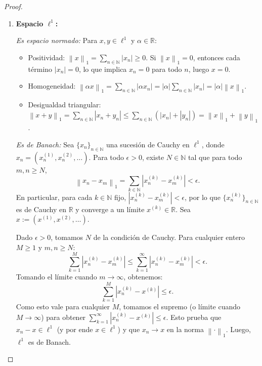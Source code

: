 \documentclass{article}
\theoremstyle{definition}
\newcommand{\R}{\mathbb{R}}
\newcommand{\N}{\mathbb{N}}
\newcommand{\norm}[1]{\left\lVert #1 \right\rVert}       %
\begin{document}
\begin{proof}
    \begin{enumerate}
        \item \textbf{Espacio \( \ell^1 \):}

              \textit{Es espacio normado:}
              Para \( x, y \in \ell^1 \) y \( \alpha \in \R \):
              \begin{itemize}
                  \item Positividad: \( \norm{x}_1 = \sum_{n\in\N} |x_n| \geq 0 \). Si \( \norm{x}_1 = 0 \), entonces cada término \( |x_n| = 0 \), lo que implica \( x_n = 0 \) para todo \( n \), luego \( x = 0 \).
                  \item Homogeneidad: \( \norm{\alpha x}_1 = \sum_{n\in\N} |\alpha x_n| = |\alpha| \sum_{n\in\N} |x_n| = |\alpha| \norm{x}_1 \).
                  \item Desigualdad triangular: \( \norm{x+y}_1 = \sum_{n\in\N} |x_n + y_n| \leq \sum_{n\in\N} (|x_n| + |y_n|) = \norm{x}_1 + \norm{y}_1 \).
              \end{itemize}

              \textit{Es de Banach:}
              Sea \( {\{x_n\}}_{n\in\N} \) una sucesión de Cauchy en \( \ell^1 \), donde \( x_n = (x_n^{(1)}, x_n^{(2)}, \dots) \).
              Para todo \( \epsilon>0 \), existe \( N\in\N \) tal que para todo \( m,n\geq N \),
              \[
                  \norm{x_n - x_m}_1 = \sum_{k\in\N} |x_n^{(k)} - x_m^{(k)}| < \epsilon.
              \]
              En particular, para cada \( k\in\N \) fijo, \( |x_n^{(k)} - x_m^{(k)}| < \epsilon \), por lo que \( {\{x_n^{(k)}\}}_{n\in\N} \) es de Cauchy en \( \R \) y converge a un límite \( x^{(k)} \in \R \). Sea \( x := (x^{(1)}, x^{(2)}, \dots) \).

              Dado \( \epsilon>0 \), tomamos \( N \) de la condición de Cauchy. Para cualquier entero \( M \geq 1 \) y \( m,n \geq N \):
              \[
                  \sum_{k=1}^M |x_n^{(k)} - x_m^{(k)}| \leq \sum_{k=1}^\infty |x_n^{(k)} - x_m^{(k)}| < \epsilon.
              \]
              Tomando el límite cuando \( m\to\infty \), obtenemos:
              \[
                  \sum_{k=1}^M |x_n^{(k)} - x^{(k)}| \leq \epsilon.
              \]
              Como esto vale para cualquier \( M \), tomamos el supremo (o límite cuando \( M\to\infty \)) para obtener \( \sum_{k=1}^\infty |x_n^{(k)} - x^{(k)}| \leq \epsilon \). Esto prueba que \( x_n - x \in \ell^1 \) (y por ende \( x \in \ell^1 \)) y que \( x_n \to x \) en la norma \( \norm{\cdot}_1 \). Luego, \( \ell^1 \) es de Banach.


\end{enumerate}
\end{proof}
\end{document}
